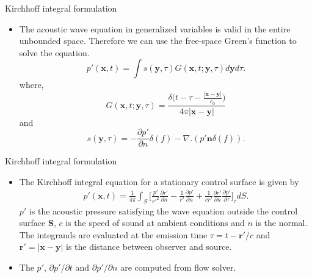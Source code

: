 \documentclass[10pt, aspectratio=169]{beamer}
\begin{document}
\begin{frame}{Kirchhoff integral formulation}
	\begin{itemize}
		\item The acoustic wave equation in generalized variables is valid in the
		entire unbounded space. Therefore we can use the free-space Green’s function to
		solve the equation.
		\begin{equation}\label{pressure}
			p'(\mathbf{x}, t) = \int s(\mathbf{y}, \tau){G(\mathbf{x}, t; \mathbf{y}, \tau )} d\mathbf{y}d\tau.
		\end{equation}
		where,
		\begin{equation}\label{Green's Function}
			G(\mathbf{x}, t; \mathbf{y}, \tau ) = \frac{\delta \Big(t - \tau - \frac{|\mathbf{x} - \mathbf{y}|}{c_{0}}\Big)}{4\pi|\mathbf{x} - \mathbf{y}|}
		\end{equation}
		and 
		\begin{equation}
			s(\mathbf{y}, \tau) = -\frac{\partial p'}{\partial n}\delta(f) - \nabla.(p' \mathbf{n} \delta(f)).
		\end{equation}
	\end{itemize}
\end{frame}

\begin{frame}{Kirchhoff integral formulation}
	\begin{itemize}
		\item The Kirchhoff integral equation for a stationary control surface is given by
		      \begin{equation}
			      \begin{split}
				      p'(\mathbf{x}, t) = \frac{1}{4\pi}\int_{S}\Big[  \frac{p'}{r'^{2}}\frac{\partial r'}{\partial n} - \frac{1}{r'}\frac{\partial p'}{\partial n} + \frac{1}{c r'}\frac{\partial r'}{\partial n}\frac{\partial p'}{\partial \tau} \Big]_{\tau} dS.
			      \end{split}
		      \end{equation}
		      $p'$ is the acoustic pressure satisfying the wave equation outside the control surface \textbf{S}, $c$ is the speed of sound at ambient conditions and $n$ is the normal.
		      The integrands are evaluated at the emission time $\tau = t - \mathbf{r'}/c$ and $\mathbf{r'}= |\mathbf{x} - \mathbf{y}|$ is the distance between observer and source.
		\item The $p'$, ${\partial p'}/{\partial t}$ and ${\partial p'}/{\partial n}$ are computed from flow solver.
	\end{itemize}
\end{frame}
\end{document}
